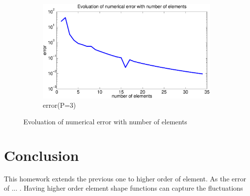 \documentclass[paper=a4, fontsize=11pt]{article} %
\begin{document}
\begin{figure}
        \begin{subfigure}[b]{0.8\textwidth}
                \includegraphics[width=\textwidth]{error_P3.eps}
                \caption{error(P=3)}
                \label{fig:e3}
        \end{subfigure}

        \caption{Evoluation of numerical error with number of elements}\label{fig:error}
\end{figure}




\section{Conclusion}

This homework extends the previous one to higher order of element. As the error of ... . Having higher order element shape functions can capture the fluctuations 
\end{document}
